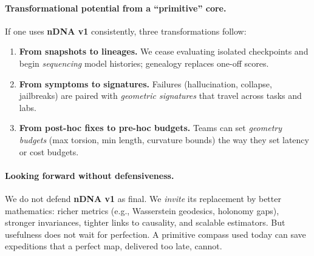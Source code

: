 \documentclass[11pt]{article}
\begin{document}
\paragraph{Transformational potential from a ``primitive'' core.}
If one uses \textbf{nDNA v1} consistently, three transformations follow:
\begin{enumerate}
  \item \textbf{From snapshots to lineages.} We cease evaluating isolated checkpoints and begin \emph{sequencing} model histories; genealogy replaces one-off scores.
  \item \textbf{From symptoms to signatures.} Failures (hallucination, collapse, jailbreaks) are paired with \emph{geometric signatures} that travel across tasks and labs.
  \item \textbf{From post-hoc fixes to pre-hoc budgets.} Teams can set \emph{geometry budgets} (max torsion, min length, curvature bounds) the way they set latency or cost budgets.
\end{enumerate}

\paragraph{Looking forward without defensiveness.}
We do not defend \textbf{nDNA v1} as final. We \emph{invite} its replacement by better mathematics: richer metrics (e.g., Wasserstein geodesics, holonomy gaps), stronger invariances, tighter links to causality, and scalable estimators. But usefulness does not wait for perfection. A primitive compass used today can save expeditions that a perfect map, delivered too late, cannot.


\end{document}
